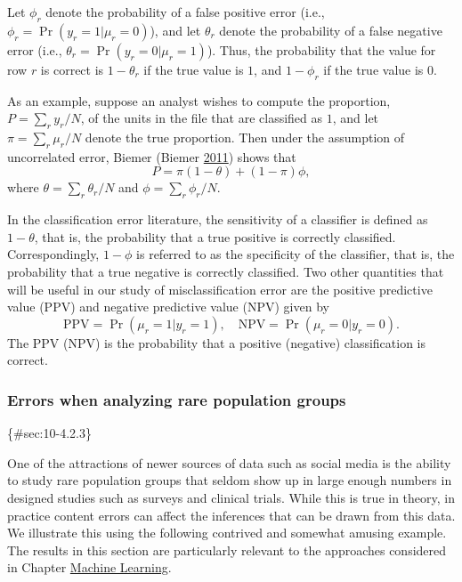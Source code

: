 \documentclass[]{krantz}
\begin{document}
Let \(\phi_r\) denote the probability of a false positive error (i.e.,
\(\phi_r = \Pr (y_r = 1\vert \mu_r = 0)\)), and let \(\theta_r\) denote
the probability of a false negative error (i.e.,
\(\theta_r =\Pr (y_r = 0\vert \mu_r = 1)\)). Thus, the probability that
the value for row \(r\) is correct is \(1 - \theta_r\) if the true value
is \(1\), and \(1 - \phi_r\) if the true value is \(0\).

As an example, suppose an analyst wishes to compute the proportion,
\(P = \sum_r {y_r / N}\), of the units in the file that are classified
as \(1\), and let \(\pi = \sum_r {\mu_r / N}\) denote the true
proportion. Then under the assumption of uncorrelated error, Biemer
(Biemer \protect\hyperlink{ref-biemer2011latent}{2011}) shows that
\[\label{eq:10-1.3}
P = \pi (1 - \theta ) + (1 - \pi )\phi,\] where
\(\theta = \sum_r {\theta_r / N}\) and \(\phi = \sum_r {\phi_r / N}\).

In the classification error literature, the sensitivity of a classifier
is defined as \(1 - \theta\), that is, the probability that a true
positive is correctly classified. Correspondingly, \(1 - \phi\) is
referred to as the specificity of the classifier, that is, the
probability that a true negative is correctly classified. Two other
quantities that will be useful in our study of misclassification error
are the positive predictive value (PPV) and negative predictive value
(NPV) given by \[\label{eq:10-1.4}
\mathrm{PPV} = \Pr (\mu_r = 1\vert y_r = 1),\quad\mathrm{NPV} = \Pr
(\mu_r = 0\vert y_r = 0).\] The PPV (NPV) is the probability that a
positive (negative) classification is correct.

\subsubsection{Errors when analyzing rare population
groups}\label{errors-when-analyzing-rare-population-groups}

\{\#sec:10-4.2.3\}

One of the attractions of newer sources of data such as social media is
the ability to study rare population groups that seldom show up in large
enough numbers in designed studies such as surveys and clinical trials.
While this is true in theory, in practice content errors can affect the
inferences that can be drawn from this data. We illustrate this using
the following contrived and somewhat amusing example. The results in
this section are particularly relevant to the approaches considered in
Chapter \protect\hyperlink{chap:ml}{Machine Learning}.
\end{document}
